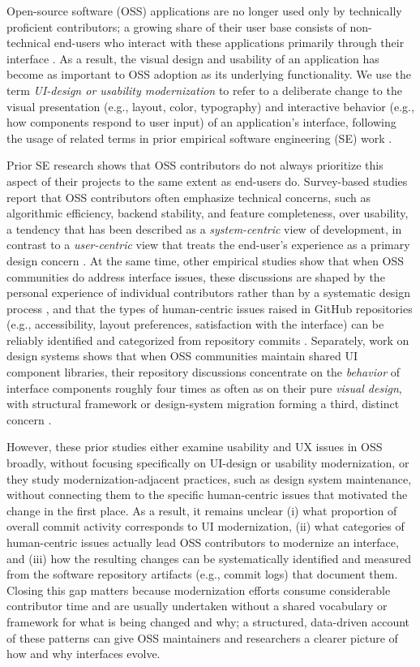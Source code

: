 \documentclass{article}
\begin{document}
Open-source software (OSS) applications are no longer used only by technically
proficient contributors; a growing share of their user base consists of
non-technical end-users who interact with these applications primarily
through their interface \cite{wang2022how}. As a result, the visual design
and usability of an application has become as important to OSS adoption as
its underlying functionality. We use the term \emph{UI-design or usability
modernization} to refer to a deliberate change to the visual presentation
(e.g., layout, color, typography) and interactive behavior (e.g., how
components respond to user input) of an application's interface, following
the usage of related terms in prior empirical software engineering (SE)
work \cite{wang2022how, lamine2022understanding}.

Prior SE research shows that OSS contributors do not always prioritize this
aspect of their projects to the same extent as end-users do. Survey-based
studies report that OSS contributors often emphasize technical concerns,
such as algorithmic efficiency, backend stability, and feature completeness, over usability, a tendency that has been described as a
\emph{system-centric} view of development, in contrast to a
\emph{user-centric} view that treats the end-user's experience as a primary
design concern \cite{wang2022how, andreasen2006usability}. At the same time,
other empirical studies show that when OSS communities do address interface
issues, these discussions are shaped by the personal experience of
individual contributors rather than by a systematic design process
\cite{cheng2018how}, and that the types of human-centric issues raised in
GitHub repositories (e.g., accessibility, layout preferences, satisfaction
with the interface) can be reliably identified and categorized from
repository commits \cite{khalajzadeh2022how}.
Separately, work on design systems shows that when OSS communities maintain
shared UI component libraries, their repository discussions concentrate on
the \emph{behavior} of interface components roughly four times as often as
on their pure \emph{visual design}, with structural framework or
design-system migration forming a third, distinct concern
\cite{lamine2022understanding}.

However, these prior studies either examine usability and UX issues in OSS
broadly, without focusing specifically on UI-design or usability
modernization, or they study modernization-adjacent practices, such as
design system maintenance, without connecting them to the specific
human-centric issues that motivated the change in the first place. As a
result, it remains unclear (i) what proportion of overall commit activity
corresponds to UI modernization, (ii) what categories of human-centric
issues actually lead OSS contributors to modernize an interface, and
(iii) how the resulting changes can be systematically identified and
measured from the software repository artifacts (e.g., commit logs) that
document them. Closing this gap matters because modernization efforts
consume considerable contributor time and are usually undertaken without a
shared vocabulary or framework for what is being changed and why; a
structured, data-driven account of these patterns can give OSS maintainers
and researchers a clearer picture of how and why interfaces evolve.
\end{document}
